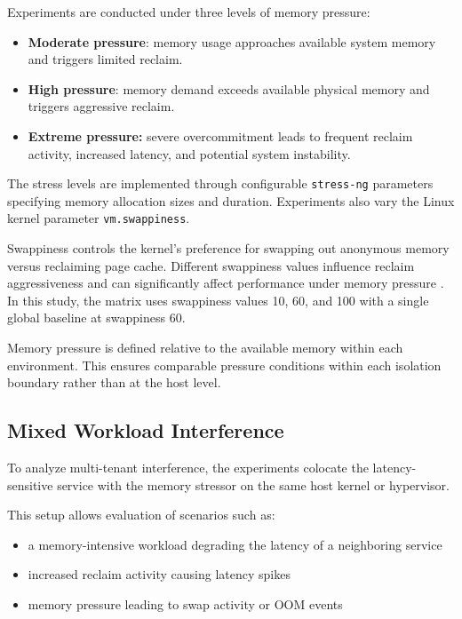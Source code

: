 \documentclass[conference]{IEEEtran}
\begin{document}
Experiments are conducted under three levels of memory pressure:

\begin{itemize}
\item \textbf{Moderate pressure}: memory usage approaches available system memory and triggers limited reclaim.
\item \textbf{High pressure}: memory demand exceeds available physical memory and triggers aggressive reclaim.
\item \textbf{Extreme pressure:} severe overcommitment leads to frequent reclaim activity, increased latency, and potential system instability.
\end{itemize}

The stress levels are implemented through configurable \texttt{stress-ng} parameters specifying memory allocation sizes and duration. Experiments also vary the Linux kernel parameter \texttt{vm.swappiness}.


Swappiness controls the kernel’s preference for swapping out anonymous memory versus reclaiming page cache. Different swappiness values influence reclaim aggressiveness and can significantly affect performance under memory pressure \cite{nakazawa2017taming}. In this study, the matrix uses swappiness values 10, 60, and 100 with a single global baseline at swappiness 60.

Memory pressure is defined relative to the available memory within each environment. This ensures comparable pressure conditions within each isolation boundary rather than at the host level.

\subsection{Mixed Workload Interference}

To analyze multi-tenant interference, the experiments colocate the latency-sensitive service with the memory stressor on the same host kernel or hypervisor.

This setup allows evaluation of scenarios such as:

\begin{itemize}
\item a memory-intensive workload degrading the latency of a neighboring service
\item increased reclaim activity causing latency spikes
\item memory pressure leading to swap activity or OOM events
\end{itemize}
\end{document}
